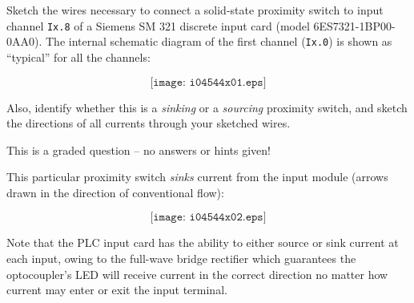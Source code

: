 

Sketch the wires necessary to connect a solid-state proximity switch to input channel {\tt Ix.8} of a Siemens SM 321 discrete input card (model 6ES7321-1BP00-0AA0).  The internal schematic diagram of the first channel ({\tt Ix.0}) is shown as ``typical'' for all the channels:

$$\texttt{[image: i04544x01.eps]}$$

Also, identify whether this is a {\it sinking} or a {\it sourcing} proximity switch, and sketch the directions of all currents through your sketched wires.

\vfil 

\eject






This is a graded question -- no answers or hints given!







This particular proximity switch {\it sinks} current from the input module (arrows drawn in the direction of conventional flow):

$$\texttt{[image: i04544x02.eps]}$$

Note that the PLC input card has the ability to either source or sink current at each input, owing to the full-wave bridge rectifier which guarantees the optocoupler's LED will receive current in the correct direction no matter how current may enter or exit the input terminal.




